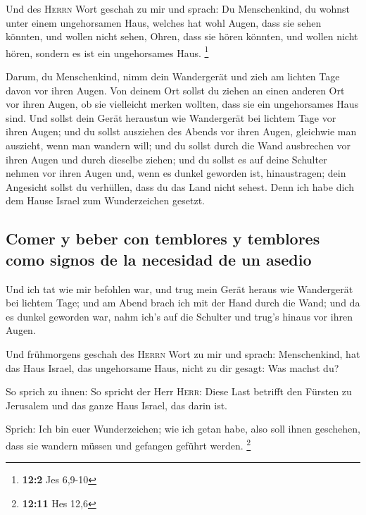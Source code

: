  Und des \textsc{Herrn} Wort geschah zu mir und sprach:
 Du Menschenkind, du wohnst unter einem ungehorsamen Haus,
welches hat wohl Augen, dass sie sehen könnten, und wollen nicht sehen,
Ohren, dass sie hören könnten, und wollen nicht hören, sondern es ist
ein ungehorsames Haus. \footnote{\textbf{12:2} Jes 6,9-10}

 Darum, du Menschenkind, nimm dein Wandergerät und zieh am
lichten Tage davon vor ihren Augen. Von deinem Ort sollst du ziehen an
einen anderen Ort vor ihren Augen, ob sie vielleicht merken wollten,
dass sie ein ungehorsames Haus sind.  Und sollst dein
Gerät heraustun wie Wandergerät bei lichtem Tage vor ihren Augen; und du
sollst ausziehen des Abends vor ihren Augen, gleichwie man auszieht,
wenn man wandern will;  und du sollst durch die Wand
ausbrechen vor ihren Augen und durch dieselbe ziehen;  und
du sollst es auf deine Schulter nehmen vor ihren Augen und, wenn es
dunkel geworden ist, hinaustragen; dein Angesicht sollst du verhüllen,
dass du das Land nicht sehest. Denn ich habe dich dem Hause Israel zum
Wunderzeichen gesetzt.

\hypertarget{comer-y-beber-con-temblores-y-temblores-como-signos-de-la-necesidad-de-un-asedio}{%
\subsection{Comer y beber con temblores y temblores como signos de la
necesidad de un
asedio}\label{comer-y-beber-con-temblores-y-temblores-como-signos-de-la-necesidad-de-un-asedio}}

 Und ich tat wie mir befohlen war, und trug mein Gerät
heraus wie Wandergerät bei lichtem Tage; und am Abend brach ich mit der
Hand durch die Wand; und da es dunkel geworden war, nahm ich's auf die
Schulter und trug's hinaus vor ihren Augen.

 Und frühmorgens geschah des \textsc{Herrn} Wort zu mir
und sprach:  Menschenkind, hat das Haus Israel, das
ungehorsame Haus, nicht zu dir gesagt: Was machst du?

 So sprich zu ihnen: So spricht der Herr \textsc{Herr}:
Diese Last betrifft den Fürsten zu Jerusalem und das ganze Haus Israel,
das darin ist.

 Sprich: Ich bin euer Wunderzeichen; wie ich getan habe,
also soll ihnen geschehen, dass sie wandern müssen und gefangen geführt
werden. \footnote{\textbf{12:11} Hes 12,6}

